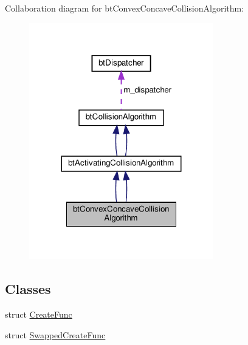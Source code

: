 Collaboration diagram for bt\+Convex\+Concave\+Collision\+Algorithm\+:
\nopagebreak
\begin{figure}[H]
\begin{center}
\leavevmode
\includegraphics[width=227pt]{classbtConvexConcaveCollisionAlgorithm__coll__graph}
\end{center}
\end{figure}
\subsection*{Classes}
\begin{DoxyCompactItemize}
\item 
struct \hyperlink{structbtConvexConcaveCollisionAlgorithm_1_1CreateFunc}{Create\+Func}
\item 
struct \hyperlink{structbtConvexConcaveCollisionAlgorithm_1_1SwappedCreateFunc}{Swapped\+Create\+Func}
\end{DoxyCompactItemize}
